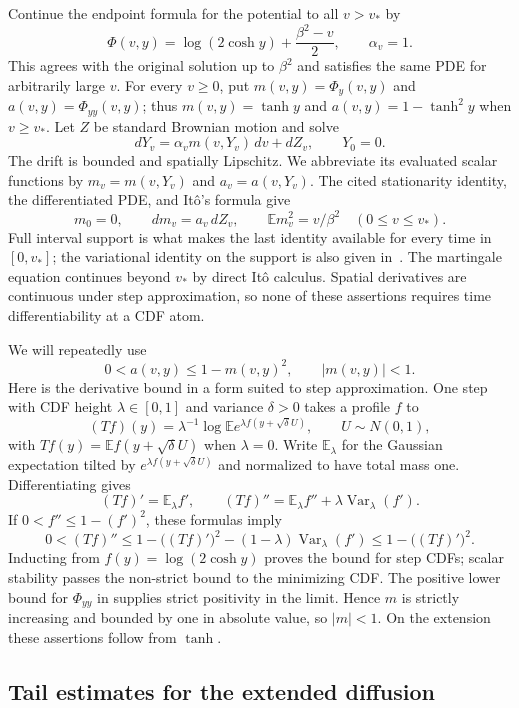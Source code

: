 Continue the endpoint formula for the potential to all $v>v_*$ by
\[
 \Phi(v,y)=\log(2\cosh y)+\frac{\beta^2-v}{2},\qquad \alpha_v=1.
\]
This agrees with the original solution up to $\beta^2$ and satisfies the
same PDE for arbitrarily large $v$. For every $v\ge0$, put
$m(v,y)=\Phi_y(v,y)$ and $a(v,y)=\Phi_{yy}(v,y)$; thus
$m(v,y)=\tanh y$ and $a(v,y)=1-\tanh^2y$ when $v\ge v_*$.
Let $Z$ be standard Brownian motion and solve
\[
 dY_v=\alpha_vm(v,Y_v)\,dv+dZ_v,\qquad Y_0=0.
\]
The drift is bounded and spatially Lipschitz. We abbreviate its evaluated
scalar functions by $m_v=m(v,Y_v)$ and $a_v=a(v,Y_v)$. The cited
stationarity identity, the differentiated PDE, and It\^o's formula give
\[
 m_0=0,\qquad dm_v=a_v\,dZ_v,\qquad
 \mathbb E m_v^2=v/\beta^2\quad(0\le v\le v_*).
\]
Full interval support is what makes the last identity available for
every time in $[0,v_*]$; the variational identity on the support is
also given in~\cite[Proposition~1.1 and Corollary~3.10]{JT2017}.
The martingale equation continues beyond $v_*$ by direct It\^o
calculus. Spatial derivatives are continuous under step approximation,
so none of these assertions requires time differentiability at a CDF
atom.

We will repeatedly use
\[
 0<a(v,y)\le1-m(v,y)^2,\qquad |m(v,y)|<1.
\]
Here is the derivative bound in a form suited to step approximation.
One step with CDF height $\lambda\in[0,1]$ and variance $\delta>0$
takes a profile $f$ to
\[
 (Tf)(y)=\lambda^{-1}\log\mathbb E
             e^{\lambda f(y+\sqrt\delta U)},\qquad U\sim N(0,1),
\]
with $Tf(y)=\mathbb E f(y+\sqrt\delta U)$ when $\lambda=0$.
Write $\mathbb E_\lambda$ for the Gaussian expectation tilted by
$e^{\lambda f(y+\sqrt\delta U)}$ and normalized to have total mass one.
Differentiating gives
\[
 (Tf)'=\mathbb E_\lambda f',\qquad
 (Tf)''=\mathbb E_\lambda f''+
                 \lambda\operatorname{Var}_\lambda(f').
\]
If $0<f''\le1-(f')^2$, these formulas imply
\[
 0<(Tf)''\le1-\bigl((Tf)'\bigr)^2
              -(1-\lambda)\operatorname{Var}_\lambda(f')
 \le1-\bigl((Tf)'\bigr)^2.
\]
Inducting from $f(y)=\log(2\cosh y)$ proves the bound for step CDFs;
scalar stability passes the non-strict bound to the minimizing CDF.
The positive lower bound for $\Phi_{yy}$ in
\cite[Proposition~2.4]{Lopatto2026} supplies strict positivity in the
limit. Hence $m$ is strictly increasing and bounded by one in absolute
value, so $|m|<1$. On the extension these assertions follow from $\tanh$.

\subsection{Tail estimates for the extended diffusion}

